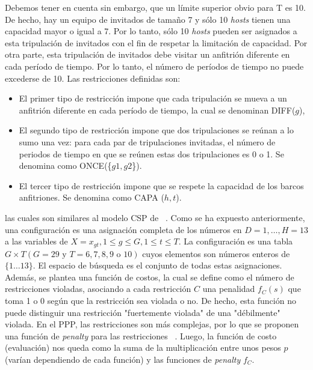 \documentclass[letter, 10pt]{article}
\begin{document}
Debemos tener en cuenta sin embargo, que un límite superior obvio para T es 10. De hecho, hay un equipo de invitados de tamaño 7 y sólo 10 \textit{hosts} tienen una capacidad mayor o igual a 7. Por lo tanto, sólo 10 \textit{hosts} pueden ser asignados a esta tripulación de invitados con el fin de respetar la limitación de capacidad. Por otra parte, esta tripulación de invitados debe visitar un anfitrión diferente en cada período de tiempo. Por lo tanto, el número de períodos de tiempo no puede excederse de 10. Las restricciones definidas son: 

\begin{itemize}
    \item El primer tipo de restricción impone que cada tripulación se mueva a un anfitrión diferente en cada período de tiempo, la cual se denominan DIFF($g$),
    \item El segundo tipo de restricción impone que dos tripulaciones se reúnan a lo sumo una vez: para cada par de tripulaciones invitadas, el número de periodos de tiempo en que se reúnen estas dos tripulaciones es 0 o 1. Se denomina como ONCE(\{$g1,g2$\}).
    \item El tercer tipo de restricción impone que se respete la capacidad de los barcos anfitriones. Se denomina como CAPA ($h,t$). 
\end{itemize}

las cuales son similares al modelo CSP de ~\cite{Smith1996}. 
Como se ha expuesto anteriormente, una configuración es una asignación completa de los números en $D = {1,\ldots ,H = 13}$ a las variables de $X = {x_{gt}, 1 \leq g \leq G, 1 \leq t \leq T}$. 
 La configuración es una tabla $G \times T (G = 29 \text{ y } T = 6,7,8,9 \text{ o }10)$ cuyos elementos son números enteros de $\{1\ldots 13\}$. El espacio de búsqueda es el conjunto de todas estas asignaciones. Además, se plantea una función de costos, la cual se define como el número de restricciones violadas, asociando a cada restricción $C$ una penalidad $f_C (s)$ que toma 1 o 0 según que la restricción sea violada o no. De hecho, esta función no puede distinguir una restricción "fuertemente violada" de una "débilmente" violada. En el PPP, las restricciones son más complejas, por lo que se proponen una función de \textit{penalty} para las restricciones ~\cite{Galinier1999}. Luego, la función de costo (evaluación) nos queda como la suma de la multiplicación entre unos pesos $p$ (varían dependiendo de cada función) y las funciones de \textit{penalty} $f_{C}$. 
\end{document}
